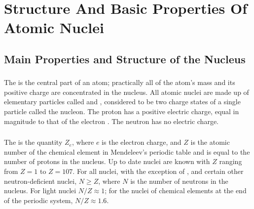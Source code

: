 



\chapter[Properties Of Atomic Nuclei]{Structure And Basic Properties Of Atomic Nuclei}
\label{ch-42}

\section{Main Properties and Structure of the Nucleus}
\label{sec-42.1} 

\subsection{}\label{42.1.1} 

The  is the central part of an atom; practically all of the atom's mass and its positive charge are concentrated in the nucleus. All atomic nuclei are made up of elementary particles  called  and , considered to be
two charge states of a single particle called the nucleon. The proton has a positive electric charge, equal in magnitude to that of the electron . The neutron has no electric charge.

\subsection{}\label{42.1.2} 

The  is the quantity $Z_{e}$, where $e$ is the electron charge, and $Z$ is the atomic number of the chemical element in Mendeleev's periodic table  and is equal to the number of protons in the nucleus. Up to date nuclei are known with $Z$ ranging from $Z = 1$ to $Z = 107$. For all nuclei, with the exception of ,  and certain other neutron-deficient nuclei, $N \geqslant  Z$, where $N$ is the number of neutrons in the nucleus. For light nuclei $N/Z \approx 1$; for the nuclei of chemical elements at the end of the periodic system, $N/Z \approx 1.6$.

